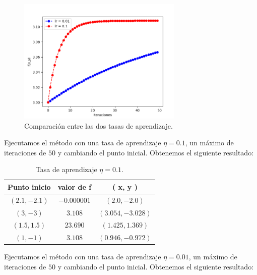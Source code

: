 \documentclass[size=a4, parskip=half, titlepage=false, toc=flat, toc=bib, 12pt]{scrartcl}
\begin{document}
\begin{figure}[H]
\centering
\includegraphics[width=0.7\textwidth]{./img/bonus23}
\caption{Comparación entre las dos tasas de aprendizaje.}
\end{figure}

Ejecutamos el método con una tasa de aprendizaje $\eta = 0.1$, un máximo de iteraciones de $50$
y cambiando el punto inicial. Obtenemos el siguiente resultado:

\begin{table}[H]
\centering
{}
\begin{tabular}{ccc}
\hline
{\color[HTML]{000000} Punto inicio}   & {\color[HTML]{000000} valor de f} & {\color[HTML]{000000} ( x, y )}          \\ \hline
{\color[HTML]{000000} $(2.1 , -2.1)$} & {\color[HTML]{000000} $-0.000001$}  & {\color[HTML]{000000} $(2.0, -2.0)$}     \\ \hline
{\color[HTML]{000000} $(3, -3)$}      & {\color[HTML]{000000} $3.108$}      & {\color[HTML]{000000} $(3.054, -3.028)$} \\ \hline
{\color[HTML]{000000} $(1.5, 1.5)$}   & {\color[HTML]{000000} $23.690$}     & {\color[HTML]{000000} $(1.425, 1.369)$}  \\ \hline
{\color[HTML]{000000} $(1, -1)$}      & {\color[HTML]{000000} $3.108$}      & {\color[HTML]{000000} $(0.946, -0.972)$} \\ \hline
\end{tabular}
\caption{Tasa de aprendizaje $\eta = 0.1$.}
\end{table}

Ejecutamos el método con una tasa de aprendizaje $\eta = 0.01$, un máximo de iteraciones de $50$
y cambiando el punto inicial. Obtenemos el siguiente resultado:
\end{document}
